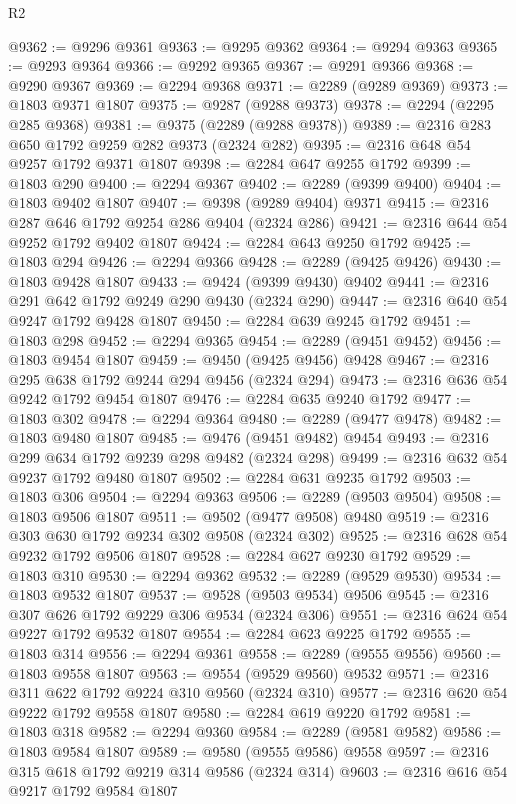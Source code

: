 \begin{lexlean}{R2}
\begin{coremodule}
@9362 := @9296 @9361
@9363 := @9295 @9362
@9364 := @9294 @9363
@9365 := @9293 @9364
@9366 := @9292 @9365
@9367 := @9291 @9366
@9368 := @9290 @9367
@9369 := @2294 @9368
@9371 := @2289 (@9289 @9369)
@9373 := @1803 @9371 @1807
@9375 := @9287 (@9288 @9373)
@9378 := @2294 (@2295 @285 @9368)
@9381 := @9375 (@2289 (@9288 @9378))
@9389 := @2316 @283 @650 @1792 @9259 @282 @9373 (@2324 @282)
@9395 := @2316 @648 @54 @9257 @1792 @9371 @1807
@9398 := @2284 @647 @9255 @1792
@9399 := @1803 @290
@9400 := @2294 @9367
@9402 := @2289 (@9399 @9400)
@9404 := @1803 @9402 @1807
@9407 := @9398 (@9289 @9404) @9371
@9415 := @2316 @287 @646 @1792 @9254 @286 @9404 (@2324 @286)
@9421 := @2316 @644 @54 @9252 @1792 @9402 @1807
@9424 := @2284 @643 @9250 @1792
@9425 := @1803 @294
@9426 := @2294 @9366
@9428 := @2289 (@9425 @9426)
@9430 := @1803 @9428 @1807
@9433 := @9424 (@9399 @9430) @9402
@9441 := @2316 @291 @642 @1792 @9249 @290 @9430 (@2324 @290)
@9447 := @2316 @640 @54 @9247 @1792 @9428 @1807
@9450 := @2284 @639 @9245 @1792
@9451 := @1803 @298
@9452 := @2294 @9365
@9454 := @2289 (@9451 @9452)
@9456 := @1803 @9454 @1807
@9459 := @9450 (@9425 @9456) @9428
@9467 := @2316 @295 @638 @1792 @9244 @294 @9456 (@2324 @294)
@9473 := @2316 @636 @54 @9242 @1792 @9454 @1807
@9476 := @2284 @635 @9240 @1792
@9477 := @1803 @302
@9478 := @2294 @9364
@9480 := @2289 (@9477 @9478)
@9482 := @1803 @9480 @1807
@9485 := @9476 (@9451 @9482) @9454
@9493 := @2316 @299 @634 @1792 @9239 @298 @9482 (@2324 @298)
@9499 := @2316 @632 @54 @9237 @1792 @9480 @1807
@9502 := @2284 @631 @9235 @1792
@9503 := @1803 @306
@9504 := @2294 @9363
@9506 := @2289 (@9503 @9504)
@9508 := @1803 @9506 @1807
@9511 := @9502 (@9477 @9508) @9480
@9519 := @2316 @303 @630 @1792 @9234 @302 @9508 (@2324 @302)
@9525 := @2316 @628 @54 @9232 @1792 @9506 @1807
@9528 := @2284 @627 @9230 @1792
@9529 := @1803 @310
@9530 := @2294 @9362
@9532 := @2289 (@9529 @9530)
@9534 := @1803 @9532 @1807
@9537 := @9528 (@9503 @9534) @9506
@9545 := @2316 @307 @626 @1792 @9229 @306 @9534 (@2324 @306)
@9551 := @2316 @624 @54 @9227 @1792 @9532 @1807
@9554 := @2284 @623 @9225 @1792
@9555 := @1803 @314
@9556 := @2294 @9361
@9558 := @2289 (@9555 @9556)
@9560 := @1803 @9558 @1807
@9563 := @9554 (@9529 @9560) @9532
@9571 := @2316 @311 @622 @1792 @9224 @310 @9560 (@2324 @310)
@9577 := @2316 @620 @54 @9222 @1792 @9558 @1807
@9580 := @2284 @619 @9220 @1792
@9581 := @1803 @318
@9582 := @2294 @9360
@9584 := @2289 (@9581 @9582)
@9586 := @1803 @9584 @1807
@9589 := @9580 (@9555 @9586) @9558
@9597 := @2316 @315 @618 @1792 @9219 @314 @9586 (@2324 @314)
@9603 := @2316 @616 @54 @9217 @1792 @9584 @1807

\end{coremodule}
\end{lexlean}
